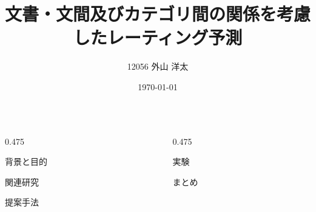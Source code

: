 \documentclass[unicode,14pt]{beamer}
\title{文書・文間及びカテゴリ間の関係を考慮したレーティング予測}
\institute{知能数理研究室}
\author{12056 外山 洋太}
\date{\today}
\newcommand{\columnsize}{0.475\textwidth}
\begin{document}
\begin{frame}
\begin{columns}[onlytextwidth,t]
  \begin{column}{\columnsize}
    \begin{block}{背景と目的}
    \end{block}
    \begin{block}{関連研究}
    \end{block}
    \begin{block}{提案手法}
    \end{block}
  \end{column}
  \begin{column}{\columnsize}
    \begin{block}{実験}
    \end{block}
    \begin{block}{まとめ}
    \end{block}
  \end{column}
\end{columns}
\end{frame}
\end{document}

